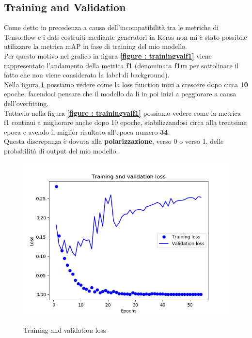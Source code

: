 \subsection{Training and Validation}
Come detto in precedenza a causa dell'incompatibilità tra le metriche di Tensorflow e i dati costruiti mediante generatori in Keras non mi è stato possibile  utilizzare la metrica mAP in fase di training del mio modello.
\\Per questo motivo nel grafico in figura \textbf{\ref{figure : trainingvalf1}} viene rappresentato l'andamento della metrica \textbf{f1} (denominata \textbf{f1m} per sottolinare il fatto che non viene considerata la label di background).
\\Nella figura \textbf{\ref{figure : trainingvalloss}} possiamo vedere come la loss function inizi a crescere dopo circa \textbf{10} epoche, facendoci pensare che il modello da li in poi inizi a peggiorare a causa dell'overfitting.
\\Tuttavia nella figura \textbf{\ref{figure : trainingvalf1}} possiamo vedere come la metrica f1 continui a migliorare anche dopo 10 epoche, stabilizzandosi circa alla trentsima epoca e avendo il miglior risultato all'epoca numero \textbf{34}.
\\Questa discrepanza è dovuta alla \textbf{polarizzazione}, verso 0 o verso 1, delle probabilità di output del mio modello.
\begin{figure}[ht]
\centering
\caption{Training and validation loss}
\includegraphics[width=\linewidth]{img/training-validation-loss.png}
\label{figure : trainingvalloss}
\end{figure}
